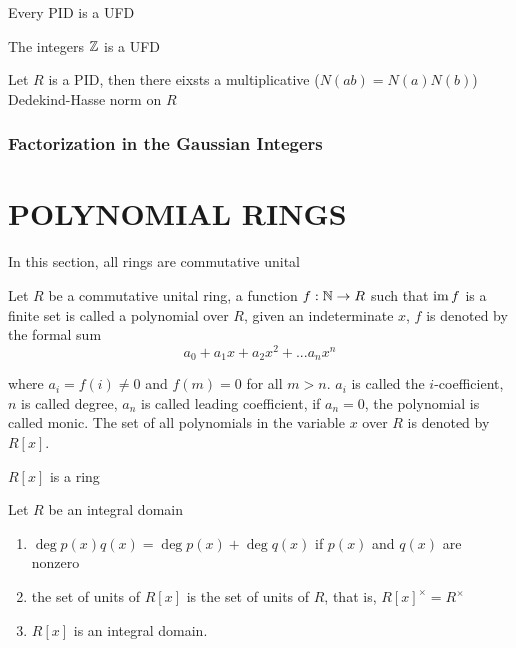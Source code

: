 \begin{theorem}
	Every PID is a UFD
\end{theorem}

\begin{corollary}
	The integers $\mathbb{Z}$ is a UFD
\end{corollary}

\begin{corollary}
	Let $R$ is a PID, then there eixsts a multiplicative ($N(ab) = N(a) N(b)$) Dedekind-Hasse norm on $R$
\end{corollary}

\subsubsection{Factorization in the Gaussian Integers}


\section{POLYNOMIAL RINGS}

\begin{remark}
	In this section, all rings are commutative unital
\end{remark}

\begin{definition}
	Let $R$ be a commutative unital ring, a function $f: \mathbb{N} \to R$ such that $\operatorname{im} f$ is a finite set is called a polynomial over $R$, given an indeterminate $x$, $f$ is denoted by the formal sum
	$$
	a_0 + a_1 x + a_2 x^2 + ... a_n x^n
	$$
	
	where $a_i  = f(i) \neq 0$ and $f(m) = 0$ for all $m > n$. $a_i$ is called the $i$-coefficient, $n$ is called degree, $a_n$ is called leading coefficient, if $a_n = 0$, the polynomial is called monic. The set of all polynomials in the variable $x$ over $R$ is denoted by $R[x]$. 
\end{definition} 

\begin{proposition}
	$R[x]$ is a ring 
\end{proposition}

\begin{proposition}
	Let $R$ be an integral domain
	\begin{enumerate}
		\item $\deg p(x) q(x) = \deg p(x) + \deg q(x)$ if $p(x)$ and $q(x)$ are nonzero
		\item the set of units of $R[x]$ is the set of units of $R$, that is, $R[x]^\times = R^\times$
		\item $R[x]$ is an integral domain.
	\end{enumerate}
\end{proposition}

